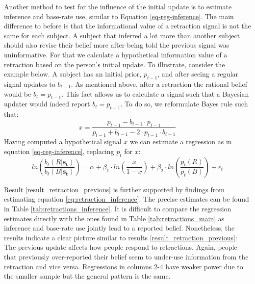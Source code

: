 \documentclass{article}
\begin{document}
Another method to test for the influence of the initial update is to estimate inference and base-rate use, similar to Equation \ref{eq-reg-inference}. The main difference to before is that the informational value of a retraction signal is not the same for each subject. A subject that inferred a lot more than another subject should also revise their belief more after being told the previous signal was uninformative. For that we calculate a hypothetical information value of a retraction based on the person's initial update. To illustrate, consider the example below. A subject has an initial prior, $p_{t-1}$, and after seeing a regular signal updates to $b_{t-1}$. As mentioned above, after a retraction the rational belief would be $b_t=p_{t-1}$. This fact allows us to calculate a signal such that a Bayesian updater would indeed report $b_t=p_{t-1}$. To do so, we reformulate Bayes rule such that: 
\begin{equation*}
    x =  \frac{p_{t-1} - b_{t-1}\cdot p_{t-1}}{p_{t-1}+b_{t-1}-2\cdot p_{t-1}\cdot b_{t-1}}
\end{equation*}
Having computed a hypothetical signal $x$ we can estimate a regression as in equation \ref{eq-reg-inference}, replacing $p_t$ for $x$:
\begin{equation}
\label{eq:retraction_inference}
    ln(\frac{b_t(R|\mathbf{s_t})}{b_t(B|\mathbf{s_t})}) = \alpha + \beta_1 \cdot ln(\frac{x}{1-x}) + \beta_2 \cdot ln(\frac{p_t(R)}{p_t(B)}) + \epsilon_t
\end{equation}

Result \ref{result_retraction_previous} is further supported by findings from estimating equation \ref{eq:retraction_inference}. The precise estimates can be found in Table \ref{tab:retractions_inference}. It is difficult to compare the regression estimates directly with the ones found in Table \ref{tab:retractions_main} as inference and base-rate use jointly lead to a reported belief. Nonetheless, the results indicate a clear picture similar to results \ref{result_retraction_previous}: The previous update affects how people respond to retractions. Again, people that previously over-reported their belief seem to under-use information from the retraction and vice versa. Regressions in columns 2-4 have weaker power due to the smaller sample but the general pattern is the same.
\end{document}
